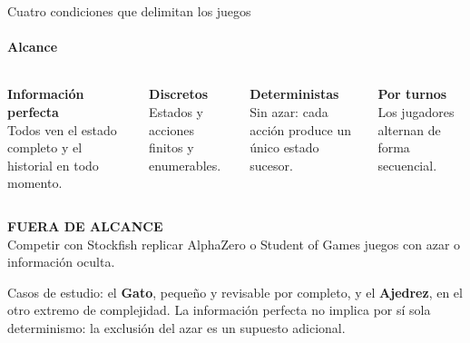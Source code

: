\documentclass[aspectratio=169,10pt,t]{beamer}
\begin{document}
\begin{frame}{Cuatro condiciones que delimitan los juegos}
\framesubtitle{Alcance}
\renewcommand{\tarjetaalto}{2.2cm}
\begin{columns}[T]
\begin{tarjeta}[azulp]
{\bfseries Información perfecta}\\[2pt]
\footnotesize Todos ven el estado completo y el historial en todo momento.
\end{tarjeta}
\begin{tarjeta}[azulp]
{\bfseries Discretos}\\[2pt]
\footnotesize Estados y acciones finitos y enumerables.
\end{tarjeta}
\begin{tarjeta}[azulp]
{\bfseries Deterministas}\\[2pt]
\footnotesize Sin azar: cada acción produce un único estado sucesor.
\end{tarjeta}
\begin{tarjeta}[azulp]
{\bfseries Por turnos}\\[2pt]
\footnotesize Los jugadores alternan de forma secuencial.
\end{tarjeta}
\end{columns}
\vspace{6pt}
\renewcommand{\grupoalto}{aparte}
\begin{tarjeta}[gris]
{\scriptsize\bfseries FUERA DE ALCANCE}\\[2pt]
\small Competir con Stockfish \textperiodcentered{} replicar AlphaZero o Student of Games \textperiodcentered{} juegos con azar o información oculta.
\end{tarjeta}
\vspace{4pt}
{\small Casos de estudio: el \textbf{Gato}, pequeño y revisable por completo, y el \textbf{Ajedrez}, en el otro extremo de complejidad. La información perfecta no implica por sí sola determinismo: la exclusión del azar es un supuesto adicional.\par}
\end{frame}
\end{document}
